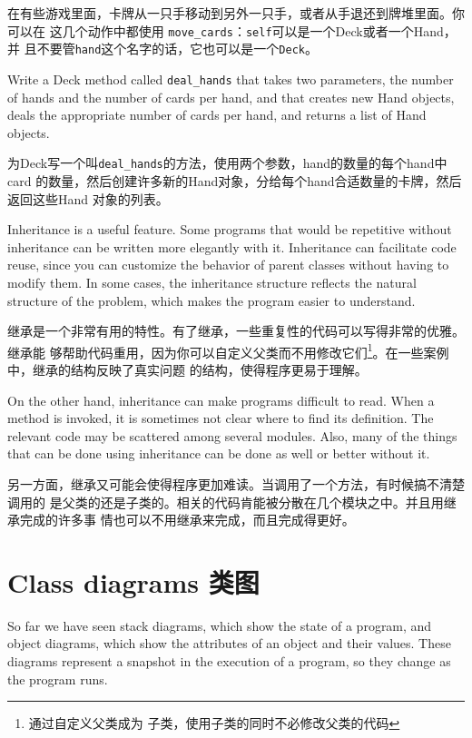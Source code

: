 \documentclass[10pt]{book}
\begin{document}
\begin{CJK}{UTF8}{gbsn}
在有些游戏里面，卡牌从一只手移动到另外一只手，或者从手退还到牌堆里面。你可以在
这几个动作中都使用 \verb"move_cards"：{\tt self}可以是一个Deck或者一个Hand，并
且不要管{\tt hand}这个名字的话，它也可以是一个{\tt Deck}。

\begin{exercise}

Write a Deck method called \verb"deal_hands" that takes two
parameters, the number of hands and the number of cards per
hand, and that creates new Hand objects, deals the appropriate
number of cards per hand, and returns a list of Hand objects.

为Deck写一个叫\verb"deal_hands"的方法，使用两个参数，hand的数量的每个hand中card
的数量，然后创建许多新的Hand对象，分给每个hand合适数量的卡牌，然后返回这些Hand
对象的列表。

\end{exercise}

Inheritance is a useful feature.  Some programs that would be
repetitive without inheritance can be written more elegantly
with it.  Inheritance can facilitate code reuse, since you can
customize the behavior of parent classes without having to modify
them.  In some cases, the inheritance structure reflects the natural
structure of the problem, which makes the program easier to
understand.

继承是一个非常有用的特性。有了继承，一些重复性的代码可以写得非常的优雅。继承能
够帮助代码重用，因为你可以自定义父类而不用修改它们\footnote{通过自定义父类成为
子类，使用子类的同时不必修改父类的代码}。在一些案例中，继承的结构反映了真实问题
的结构，使得程序更易于理解。

On the other hand, inheritance can make programs difficult to read.
When a method is invoked, it is sometimes not clear where to find its
definition.  The relevant code may be scattered among several modules.
Also, many of the things that can be done using inheritance can be
done as well or better without it.  

另一方面，继承又可能会使得程序更加难读。当调用了一个方法，有时候搞不清楚调用的
是父类的还是子类的。相关的代码肯能被分散在几个模块之中。并且用继承完成的许多事
情也可以不用继承来完成，而且完成得更好。


\section{Class diagrams 类图}
\label{class.diagram}

So far we have seen stack diagrams, which show the state of
a program, and object diagrams, which show the attributes
of an object and their values.  These diagrams represent a snapshot
in the execution of a program, so they change as the program
runs.


\end{CJK}
\end{document}
